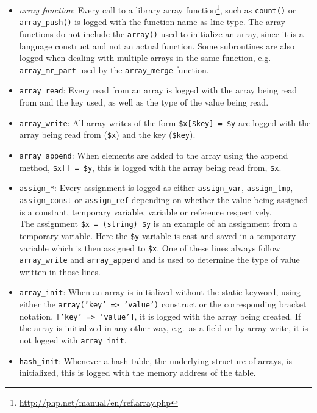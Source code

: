 \begin{itemize}
\item \emph{array function}: Every call to a library array function\footnote{\url{http://php.net/manual/en/ref.array.php}}, such as \texttt{count()} or \texttt{array\_push()} is logged with the function name as line type. The array functions do not include the \texttt{array()} used to initialize an array, since it is a language construct and not an actual function. Some subroutines are also logged when dealing with multiple arrays in the same function, e.g. \texttt{array\_mr\_part} used by the \texttt{array\_merge} function.
\item \texttt{array\_read}: Every read from an array is logged with the array being read from and the key used, as well as the type of the value being read.
\item \texttt{array\_write}: All array writes of the form \texttt{\$x[\$key] = \$y} are logged with the array being read from (\texttt{\$x}) and the key (\texttt{\$key}). 
\item \texttt{array\_append}: When elements are added to the array using the append method, \texttt{\$x[] = \$y}, this is logged with the array being read from, \texttt{\$x}.
\item \texttt{assign\_*}: Every assignment is logged as either \texttt{assign\_var}, \texttt{assign\_tmp}, \texttt{assign\_const} or \texttt{assign\_ref} depending on whether the value being assigned is a constant, temporary variable, variable or reference respectively.\\
The assignment \texttt{\$x = (string) \$y} is an example of an assignment from a temporary variable. Here the \texttt{\$y} variable is cast and saved in a temporary variable which is then assigned to \texttt{\$x}. One of these lines always follow \texttt{array\_write} and \texttt{array\_append} and is used to determine the type of value written in those lines.
\item \texttt{array\_init}: When an array is initialized without the static keyword, using either the \texttt{array('key' => 'value')} construct or the corresponding bracket notation, \texttt{['key' => 'value']}, it is logged with the array being created. If the array is initialized in any other way, e.g.\ as a field or by array write, it is not logged with \texttt{array\_init}.
\item \texttt{hash\_init}: Whenever a hash table, the underlying structure of arrays, is initialized, this is logged with the memory address of the table.
\end{itemize}

